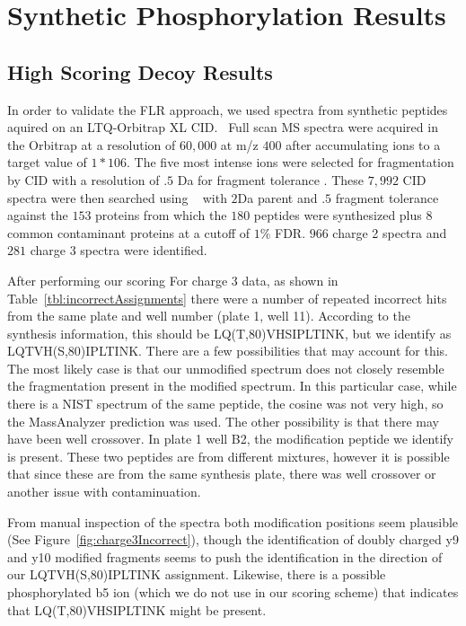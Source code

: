 \setcounter{page}{1}
\setcounter{figure}{0}  %

\section{Synthetic Phosphorylation Results}
\subsection{High Scoring Decoy Results}\label{sec:highScoringDecoyCharge3}
In order to validate the FLR approach, we used spectra from synthetic peptides aquired on an LTQ-Orbitrap XL CID.~\cite{savitski11} Full scan MS spectra were acquired in the Orbitrap at a resolution of $60,000$ at m/z $400$ after accumulating ions to a target value of $1*106$. The five most intense ions were selected for fragmentation by CID with a resolution of $.5$ Da for fragment tolerance . These $7,992$ CID spectra were then searched using \inspect ~\cite{tanner05} with $2$Da parent and $.5$ fragment tolerance against the $153$ proteins from which the $180$ peptides were synthesized plus $8$ common contaminant proteins at a cutoff of $1\%$ FDR. $966$ charge 2 spectra and $281$ charge 3 spectra were identified.

After performing our scoring For charge 3 data, as shown in Table~\ref{tbl:incorrectAssignments} there were a number of repeated incorrect hits from the same plate and well number (plate 1, well 11). According to the synthesis information, this should be LQ(T,80)VHSIPLTINK, but we identify as LQTVH(S,80)IPLTINK. There are a few possibilities that may account for this. The most likely case is that our unmodified spectrum does not closely resemble the fragmentation present in the modified spectrum. In this particular case, while there is a NIST spectrum of the same peptide, the cosine was not very high, so the MassAnalyzer prediction was used. The other possibility is that there may have been well crossover. In  plate 1 well B2, the modification peptide we identify is present. These two peptides are from different mixtures, however it is possible that since these are from the same synthesis plate, there was well crossover or another issue with contaminuation.

From manual inspection of the spectra both modification positions seem plausible (See  Figure~\ref{fig:charge3Incorrect}), though the identification of doubly charged y9 and y10 modified fragments seems to push the identification in the direction of our LQTVH(S,80)IPLTINK assignment. Likewise, there is a possible phosphorylated b5 ion (which we do not use in our scoring scheme) that indicates that LQ(T,80)VHSIPLTINK might be present.

